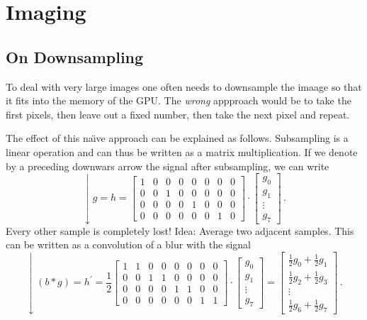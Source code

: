 \chapter{Imaging}%
\label{chap:02}
\setcounter{section}{1}
\section{On Downsampling}
To deal with very large images one often needs to downsample the
imaage so that it fits into the memory of the GPU. The \emph{wrong}
appproach would be to take the first pixels, then leave out a fixed
number, then take the next pixel and repeat.  

The effect of this na\"\i{}ve approach can be explained as follows.
Subsampling is a linear operation and can thus be written as a matrix
multiplication. If we denote by a preceding downwars arrow the signal
after subsampling, we can write
\begin{equation*}
  \downarrow g = h =
  \begin{bmatrix}
    1 & 0 & 0 & 0 & 0 & 0 & 0 & 0 \\
    0 & 0 & 1 & 0 & 0 & 0 & 0 & 0 \\
    0 & 0 & 0 & 0 & 1 & 0 & 0 & 0 \\
    0 & 0 & 0 & 0 & 0 & 0 & 1 & 0
  \end{bmatrix}
  \cdot
  \begin{bmatrix}
    g_0 \\ g_1 \\ \vdots \\ g_7
  \end{bmatrix}\,.
\end{equation*}
Every other sample is completely lost! Idea: Average two adjacent
samples. This can be written as a convolution of a blur with the
signal
\begin{equation*}
  \downarrow (b \ast g) = h^\prime = \frac{1}{2}
  \begin{bmatrix}
    1 & 1 & 0 & 0 & 0 & 0 & 0 & 0 \\
    0 & 0 & 1 & 1 & 0 & 0 & 0 & 0 \\
    0 & 0 & 0 & 0 & 1 & 1 & 0 & 0 \\
    0 & 0 & 0 & 0 & 0 & 0 & 1 & 1
  \end{bmatrix}
  \cdot
  \begin{bmatrix}
    g_0 \\ g_1 \\ \vdots \\ g_7
  \end{bmatrix}
  =
  \begin{bmatrix}
    \frac{1}{2} g_0 + \frac{1}{2} g_1 \\
    \frac{1}{2} g_2 + \frac{1}{2} g_3 \\
    \vdots \\
    \frac{1}{2} g_6 + \frac{1}{2} g_7
  \end{bmatrix}\,.
\end{equation*}
